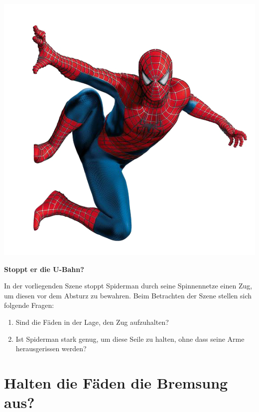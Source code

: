\documentclass[a4paper, 11pt, nofonts, 
twoside, sfsidenotes, nobib, justified]{tufte-handout}
\begin{document}
\begin{marginfigure}
	\centering
	\includegraphics[width = \linewidth]{material/08 deko2.png}
\end{marginfigure}
{\bfseries{\LARGE Stoppt er die U-Bahn?} }
\vspace{1em}

In der vorliegenden Szene stoppt Spiderman durch seine Spinnennetze einen Zug, um diesen vor dem Absturz zu bewahren. Beim Betrachten der Szene stellen sich folgende Fragen:
\begin{enumerate}[nolistsep]
	\item Sind die Fäden in der Lage, den Zug aufzuhalten?
	\item Ist Spiderman stark genug, um diese Seile zu halten, ohne dass seine Arme herausgerissen werden?
\end{enumerate}
\section{Halten die Fäden die Bremsung aus?} 
\end{document}
